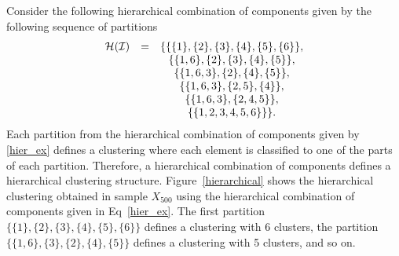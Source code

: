 \documentclass[10pt, a4paper]{article}
\begin{document}
%

Consider the following hierarchical combination of components given by the following sequence of partitions
\begin{equation}
\begin{array}{r c c}
\mathcal{H}(\mathcal{I}) &=& \{ \{\{1\},\{2\},\{3\},\{4\},\{5\},\{6\}\}, \\
   & & \{\{1, 6\},\{2\},\{3\},\{4\},\{5\} \}, \\
   & &    \{\{1, 6, 3\},\{2\},\{4\},\{5\} \}, \\
   & &    \{\{1, 6, 3\},\{2, 5\},\{4 \} \}, \\
    & &   \{\{1, 6, 3\},\{2, 4, 5\} \}, \\
   & &    \{\{1, 2, 3, 4, 5, 6\}\} \}.
\end{array}
\label{hier_ex}
\end{equation}
Each partition from the hierarchical combination of components given by \ref{hier_ex} defines a clustering where each element is classified to one of the parts of each partition. Therefore, a hierarchical combination of components defines a hierarchical clustering structure. Figure~\ref{hierarchical} shows the hierarchical clustering obtained in sample $X_{500}$ using the hierarchical combination of components given in Eq~\ref{hier_ex}. The first partition $\{\{1\},\{2\},\{3\},\{4\},\{5\},\{6\}\}$ defines a clustering with 6 clusters, the partition $\{\{1, 6\}, \{3\},\{2\},\{4\},\{5\} \}$ defines a clustering with 5 clusters, and so on.
\end{document}
